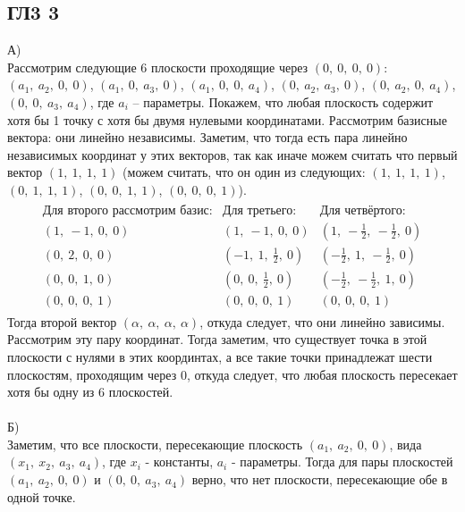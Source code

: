 		\subsection{ГЛ3 3}		
		А)\\
		Рассмотрим следующие 6 плоскости проходящие через $(0,\ 0,\ 0,\ 0)$: $(a_1,\ a_2,\ 0,\ 0)$, $(a_1,\ 0,\ a_3,\ 0)$, $(a_1,\ 0,\ 0,\ a_4)$, $(0,\ a_2,\ a_3,\ 0)$, $(0,\ a_2,\ 0,\ a_4)$, $(0,\ 0,\ a_3,\ a_4)$, где $a_i$ -- параметры. Покажем, что любая плоскость содержит хотя бы 1 точку с хотя бы двумя нулевыми координатами. Рассмотрим базисные вектора: они линейно независимы. Заметим, что тогда есть пара линейно независимых координат у этих векторов, так как иначе можем считать что первый вектор $(1,\ 1,\ 1,\ 1)$ (можем считать, что он один из следующих: $(1,\ 1,\ 1,\ 1)$, $(0,\ 1,\ 1,\ 1)$, $(0,\ 0,\ 1,\ 1)$, $(0,\ 0,\ 0,\ 1)$). 
		\begin{gather*}
			\begin{matrix}
				\text{Для второго рассмотрим базис:} & \text{Для третьего:} & \text{Для четвёртого:} \\
				(1,\ -1,\ 0,\ 0) & ( 1,\ -1,\ 0,\ 0) & ( 1 ,\ -\frac{1}{2},\ -\frac{1}{2},\ 0) \\
				(0,\ 2,\ 0,\ 0) & (-1,\ 1,\ \frac{1}{2},\ 0) & ( -\frac{1}{2},\ 1 ,\ -\frac{1}{2},\ 0) \\
				(0,\ 0,\ 1,\ 0) & ( 0,\ 0,\ \frac{1}{2},\ 0) & ( -\frac{1}{2},\ -\frac{1}{2},\ 1,\ 0) \\
				(0,\ 0,\ 0,\ 1) & ( 0,\ 0,\ 0,\ 1) & ( 0,\ 0,\ 0,\ 1) 
			\end{matrix}
		\end{gather*}
		Тогда второй вектор $(\alpha,\ \alpha,\ \alpha,\ \alpha)$, откуда следует, что они линейно зависимы.
		Рассмотрим эту пару координат. Тогда заметим, что существует точка в этой плоскости с нулями в этих координтах, а все такие точки принадлежат шести плоскостям, проходящим через 0, откуда следует, что любая плоскость пересекает хотя бы одну из 6 плоскостей.\\
		\\
		Б)\\
		Заметим, что все плоскости, пересекающие плоскость $(a_1,\ a_2,\ 0,\ 0)$, вида $(x_1,\ x_2,\ a_3,\ a_4)$, где $x_i$ - константы, $a_i$ - параметры. Тогда для пары плоскостей $(a_1,\ a_2,\ 0,\ 0)$ и $(0,\ 0,\ a_3,\ a_4)$ верно, что нет плоскости, пересекающие обе в одной точке.
		\\
		
